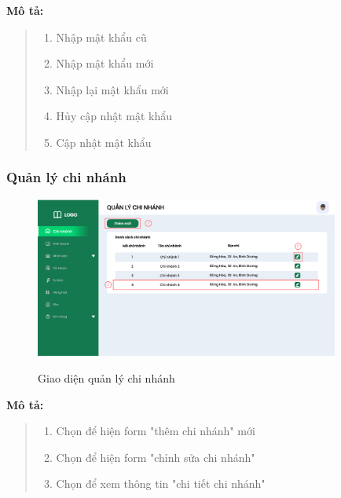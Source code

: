             \textbf{Mô tả:}  
            \begin{quote}
                \begin{enumerate}
                    \item Nhập mật khẩu cũ
                    \item Nhập mật khẩu mới
                    \item Nhập lại mật khẩu mới
                    \item Hủy cập nhật mật khẩu
                    \item Cập nhật mật khẩu
                \end{enumerate}
            \end{quote}
    
        \subsubsection{Quản lý chi nhánh}
            \begin{figure}[!htp]
                \centering
                \includegraphics[width=10cm]{img/UI/admin/branch.png}
                \label{19}
                \newline
                \caption{Giao diện quản lý chi nhánh}
            \end{figure}
            \textbf{Mô tả:}  
            \begin{quote}
                \begin{enumerate}
                    \item Chọn để hiện form "thêm chi nhánh" mới
                    \item Chọn để hiện form "chỉnh sửa chi nhánh"
                    \item Chọn để xem thông tin "chi tiết chi nhánh"
                \end{enumerate}
            \end{quote}
                
